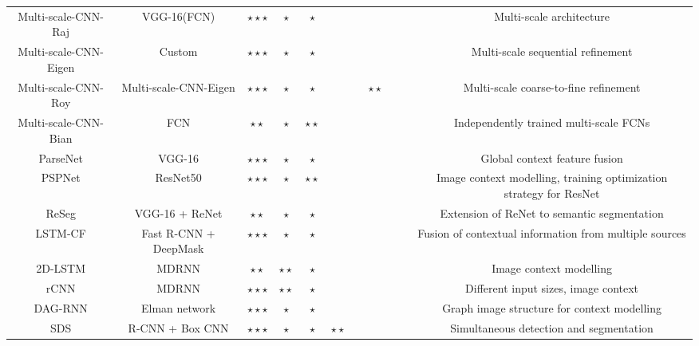 \begin{table*}[!t]
{\begin{tabular}{|c|c|c|c|c|c|c|c|c|c|c|}
		Multi-scale-CNN-Raj\cite{Raj2015} & \acs{VGG}-16(FCN) & $\star\star\star$ & $\star$ & $\star$ & \xmark & \xmark & \xmark & \xmark & \xmark & Multi-scale architecture\\
		Multi-scale-CNN-Eigen\cite{Eigen2015} & Custom & $\star\star\star$ & $\star$ & $\star$ & \xmark & \xmark & \xmark & \xmark & \cmark & Multi-scale sequential refinement\\
		Multi-scale-CNN-Roy\cite{Roy2016} & Multi-scale-CNN-Eigen & $\star\star\star$ & $\star$ & $\star$ & \xmark & \xmark & $\star\star$ & \xmark & \xmark & Multi-scale coarse-to-fine refinement\\
		Multi-scale-CNN-Bian\cite{Bian2016} & \acs{FCN} & $\star\star$ & $\star$ & $\star\star$ & \xmark & \xmark & \xmark & \xmark & \xmark & Independently trained multi-scale \acsp{FCN}\\
		ParseNet\cite{Liu2015} & \acs{VGG}-16 & $\star\star\star$ & $\star$ & $\star$ & \xmark & \xmark & \xmark & \xmark  & \cmark & Global context feature fusion\\ 
		\acs{PSPNet} \cite{Zhao2016} & ResNet50 & $\star\star\star$ & $\star$ & $\star\star$ & \xmark & \xmark & \xmark & \xmark & \cmark & Image context modelling, training optimization strategy for ResNet\\
		ReSeg\cite{Visin2016} & \acs{VGG}-16 + ReNet & $\star\star$ & $\star$ & $\star$ & \xmark & \xmark & \xmark & \xmark & \cmark & Extension of ReNet to semantic segmentation\\
		\acs{LSTM-CF}\cite{Li2016b} & Fast R-CNN + DeepMask & $\star\star\star$ & $\star$ & $\star$ & \xmark & \xmark & \xmark & \xmark & \cmark & Fusion of contextual information from multiple sources\\
		2D-LSTM\cite{Byeon2015} & \acs{MDRNN} & $\star\star$ & $\star\star$ & $\star$ & \xmark & \xmark & \xmark & \xmark & \xmark & Image context modelling\\
		rCNN\cite{Pinheiro2014} & \acs{MDRNN} & $\star\star\star$ & $\star\star$ & $\star$ & \xmark & \xmark & \xmark & \xmark & \cmark & Different input sizes, image context\\
		DAG-RNN\cite{Shuai2015} & Elman network & $\star\star\star$ & $\star$ & $\star$ & \xmark & \xmark & \xmark & \xmark & \cmark & Graph image structure for context modelling\\
		\acs{SDS}\cite{Hariharan2014} & \acs{R-CNN} + Box \acs{CNN} & $\star\star\star$ & $\star$ & $\star$ & $\star\star$ & \xmark & \xmark & \xmark  & \cmark & Simultaneous detection and segmentation\\

\end{tabular}}
\end{table*}
